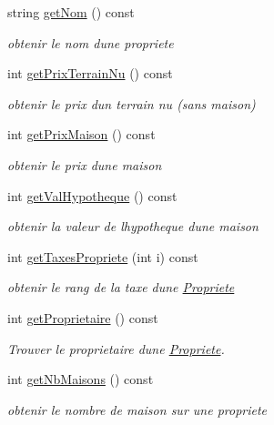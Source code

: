 \begin{DoxyCompactItemize}
string \hyperlink{classPropriete_ac2f237f87a384e2c1227b471bbda889c}{get\+Nom} () const 
\begin{DoxyCompactList}\small\item\em obtenir le nom d\textquotesingle{}une propriete \end{DoxyCompactList}\item 
int \hyperlink{classPropriete_a3171ba14fb6df11e6f4cdee179e0311e}{get\+Prix\+Terrain\+Nu} () const 
\begin{DoxyCompactList}\small\item\em obtenir le prix d\textquotesingle{}un terrain nu (sans maison) \end{DoxyCompactList}\item 
int \hyperlink{classPropriete_a0349bbabae125e3ae1868b30a9d83628}{get\+Prix\+Maison} () const 
\begin{DoxyCompactList}\small\item\em obtenir le prix d\textquotesingle{}une maison \end{DoxyCompactList}\item 
int \hyperlink{classPropriete_a818ce7499d6e34c8cba413f4c7fc1980}{get\+Val\+Hypotheque} () const 
\begin{DoxyCompactList}\small\item\em obtenir la valeur de l\textquotesingle{}hypotheque d\textquotesingle{}une maison \end{DoxyCompactList}\item 
int \hyperlink{classPropriete_a3122317d919b87da44ec240aed7dff62}{get\+Taxes\+Propriete} (int i) const 
\begin{DoxyCompactList}\small\item\em obtenir le rang de la taxe d\textquotesingle{}une \hyperlink{classPropriete}{Propriete} \end{DoxyCompactList}\item 
int \hyperlink{classPropriete_a006c7b50d9d7d7da46ba76e43825595e}{get\+Proprietaire} () const 
\begin{DoxyCompactList}\small\item\em Trouver le proprietaire d\textquotesingle{}une \hyperlink{classPropriete}{Propriete}. \end{DoxyCompactList}\item 
int \hyperlink{classPropriete_ac69da1f6e060e536b7f6f0aaee73e1b2}{get\+Nb\+Maisons} () const 
\begin{DoxyCompactList}\small\item\em obtenir le nombre de maison sur une propriete \end{DoxyCompactList}\item 

\end{DoxyCompactItemize}
